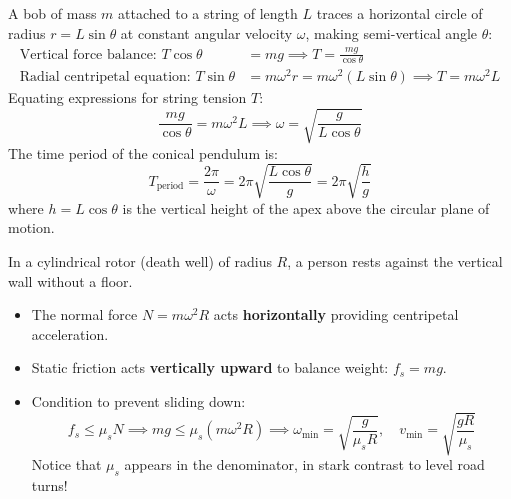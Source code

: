 \documentclass[10pt,a4paper]{article}
\begin{document}
\begin{usecasebox}
A bob of mass $m$ attached to a string of length $L$ traces a horizontal circle of radius $r = L\sin\theta$ at constant angular velocity $\omega$, making semi-vertical angle $\theta$:
\begin{align}
  \text{Vertical force balance: } T\cos\theta &= mg \implies T = \frac{mg}{\cos\theta} \\
  \text{Radial centripetal equation: } T\sin\theta &= m\omega^2 r = m\omega^2(L\sin\theta) \implies T = m\omega^2 L
\end{align}
Equating expressions for string tension $T$:
\begin{equation}
  \frac{mg}{\cos\theta} = m\omega^2 L \implies \omega = \sqrt{\frac{g}{L\cos\theta}}
\end{equation}
The time period of the conical pendulum is:
\begin{equation}
  T_{\text{period}} = \frac{2\pi}{\omega} = 2\pi\sqrt{\frac{L\cos\theta}{g}} = 2\pi\sqrt{\frac{h}{g}}
\end{equation}
where $h = L\cos\theta$ is the vertical height of the apex above the circular plane of motion.
\end{usecasebox}

\begin{trapbox}
In a cylindrical rotor (death well) of radius $R$, a person rests against the vertical wall without a floor.
\begin{itemize}
  \item The normal force $N = m\omega^2 R$ acts \textbf{horizontally} providing centripetal acceleration.
  \item Static friction acts \textbf{vertically upward} to balance weight: $f_s = mg$.
  \item Condition to prevent sliding down:
  \begin{equation}
    f_s \le \mu_s N \implies mg \le \mu_s(m\omega^2 R) \implies \omega_{\min} = \sqrt{\frac{g}{\mu_s R}}, \quad v_{\min} = \sqrt{\frac{gR}{\mu_s}}
  \end{equation}
  Notice that $\mu_s$ appears in the denominator, in stark contrast to level road turns!
\end{itemize}
\end{trapbox}

\end{document}
